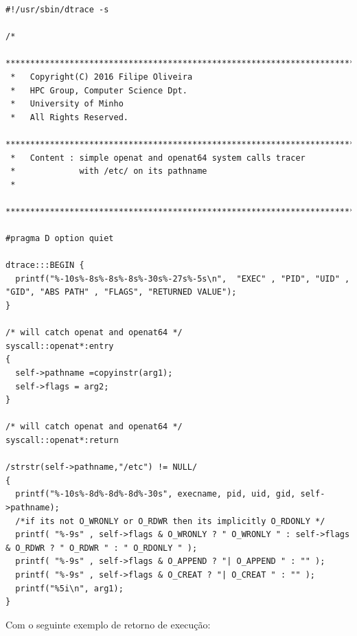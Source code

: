\documentclass[a4paper]{article}
\begin{document}
 \begin{lstlisting}[basicstyle=\scriptsize]
 #!/usr/sbin/dtrace -s

/*
 ********************************************************************************
 *   Copyright(C) 2016 Filipe Oliveira
 *   HPC Group, Computer Science Dpt.
 *   University of Minho
 *   All Rights Reserved.
 ********************************************************************************
 *   Content : simple openat and openat64 system calls tracer 
 *             with /etc/ on its pathname
 *     
 ********************************************************************************/

#pragma D option quiet

dtrace:::BEGIN {
  printf("%-10s%-8s%-8s%-8s%-30s%-27s%-5s\n",  "EXEC" , "PID", "UID" , "GID", "ABS PATH" , "FLAGS", "RETURNED VALUE");
}

/* will catch openat and openat64 */
syscall::openat*:entry
{
  self->pathname =copyinstr(arg1);
  self->flags = arg2;
}

/* will catch openat and openat64 */
syscall::openat*:return

/strstr(self->pathname,"/etc") != NULL/
{
  printf("%-10s%-8d%-8d%-8d%-30s", execname, pid, uid, gid, self->pathname);
  /*if its not O_WRONLY or O_RDWR then its implicitly O_RDONLY */
  printf( "%-9s" , self->flags & O_WRONLY ? " O_WRONLY " : self->flags & O_RDWR ? " O_RDWR " : " O_RDONLY " ); 
  printf( "%-9s" , self->flags & O_APPEND ? "| O_APPEND " : "" );
  printf( "%-9s" , self->flags & O_CREAT ? "| O_CREAT " : "" );
  printf("%5i\n", arg1);
}
 \end{lstlisting}

Com o seguinte exemplo de retorno de execução:
\end{document}
